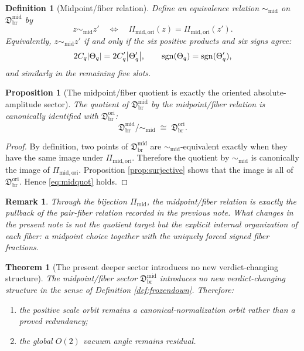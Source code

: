 \documentclass[11pt]{article}
\newcommand{\OriginSector}{\mathfrak D_{\mathrm{br}}^{\mathrm{ori}}}
\newcommand{\MidFiberSector}{\mathfrak D_{\mathrm{br}}^{\mathrm{mid}}}
\newcommand{\MidPairMap}{\Pi_{\mathrm{mid}}}
\newcommand{\MidOriginMap}{\Pi_{\mathrm{mid,ori}}}
\newcommand{\MidFiberRel}{\sim_{\mathrm{mid}}}
\newcommand{\MidRead}{C_{q}}
\newcommand{\FiberRead}{\Theta_{q}}
\newtheorem{definition}{Definition}
\newtheorem{proposition}{Proposition}
\newtheorem{remark}{Remark}
\newtheorem{theorem}{Theorem}
\begin{document}
\begin{definition}[Midpoint/fiber relation]
\label{def:midrel}
Define an equivalence relation \(\MidFiberRel\) on \(\MidFiberSector\) by
\begin{equation}
z\MidFiberRel z'
\quad\Longleftrightarrow\quad
\MidOriginMap(z)=\MidOriginMap(z').
\label{eq:midrel}
\end{equation}
Equivalently, \(z\MidFiberRel z'\) if and only if the six positive products and six signs agree:
\begin{equation}
2\MidRead\abs{\FiberRead}=2\MidRead'\abs{\FiberRead'},
\qquad
\operatorname{sgn}(\FiberRead)=\operatorname{sgn}(\FiberRead'),
\label{eq:midrelA}
\end{equation}
and similarly in the remaining five slots.
\end{definition}

\begin{proposition}[The midpoint/fiber quotient is exactly the oriented absolute-amplitude sector]
\label{prop:midquot}
The quotient of \(\MidFiberSector\) by the midpoint/fiber relation is canonically identified with \(\OriginSector\):
\begin{equation}
\MidFiberSector/\MidFiberRel
\;\cong\;
\OriginSector.
\label{eq:midquot}
\end{equation}
\end{proposition}

\begin{proof}
By definition, two points of \(\MidFiberSector\) are \(\MidFiberRel\)-equivalent exactly when they have the same image under \(\MidOriginMap\). Therefore the quotient by \(\MidFiberRel\) is canonically the image of \(\MidOriginMap\). Proposition \ref{prop:surjective} shows that the image is all of \(\OriginSector\). Hence \eqref{eq:midquot} holds.
\end{proof}

\begin{remark}
Through the bijection \(\MidPairMap\), the midpoint/fiber relation is exactly the pullback of the pair-fiber relation recorded in the previous note. What changes in the present note is not the quotient target but the explicit internal organization of each fiber: a midpoint choice together with the uniquely forced signed fiber fractions.
\end{remark}

\begin{theorem}[The present deeper sector introduces no new verdict-changing structure]
\label{thm:verdict}
The midpoint/fiber sector \(\MidFiberSector\) introduces no new verdict-changing structure in the sense of Definition \ref{def:frozendown}. Therefore:
\begin{enumerate}
    \item the positive scale orbit remains a canonical-normalization orbit rather than a proved redundancy;
    \item the global \(O(2)\) vacuum angle remains residual.
\end{enumerate}
\end{theorem}
\end{document}
